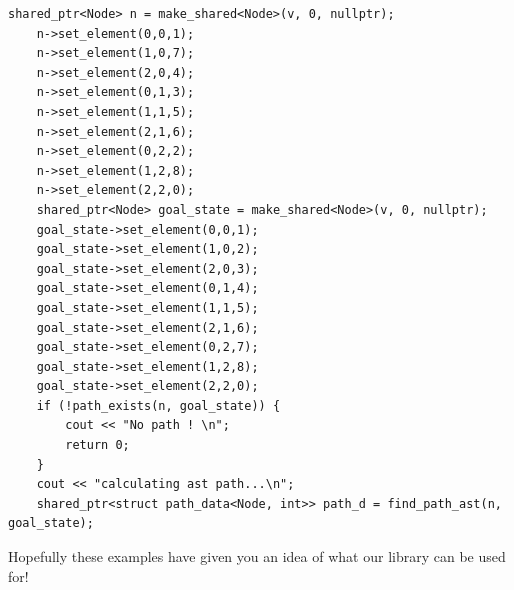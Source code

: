 \documentclass{article}
\begin{document}
\begin{lstlisting}
shared_ptr<Node> n = make_shared<Node>(v, 0, nullptr);
	n->set_element(0,0,1);
	n->set_element(1,0,7);
	n->set_element(2,0,4);
	n->set_element(0,1,3);
	n->set_element(1,1,5);
	n->set_element(2,1,6);
	n->set_element(0,2,2);
	n->set_element(1,2,8);
	n->set_element(2,2,0);
	shared_ptr<Node> goal_state = make_shared<Node>(v, 0, nullptr);
	goal_state->set_element(0,0,1);
	goal_state->set_element(1,0,2);
	goal_state->set_element(2,0,3);
	goal_state->set_element(0,1,4);
	goal_state->set_element(1,1,5);
	goal_state->set_element(2,1,6);
	goal_state->set_element(0,2,7);
	goal_state->set_element(1,2,8);
	goal_state->set_element(2,2,0);
	if (!path_exists(n, goal_state)) {
		cout << "No path ! \n";
		return 0;
	}
	cout << "calculating ast path...\n";
	shared_ptr<struct path_data<Node, int>> path_d = find_path_ast(n, goal_state);
\end{lstlisting}

Hopefully these examples have given you an idea of what our library can be used for!
\end{document}
